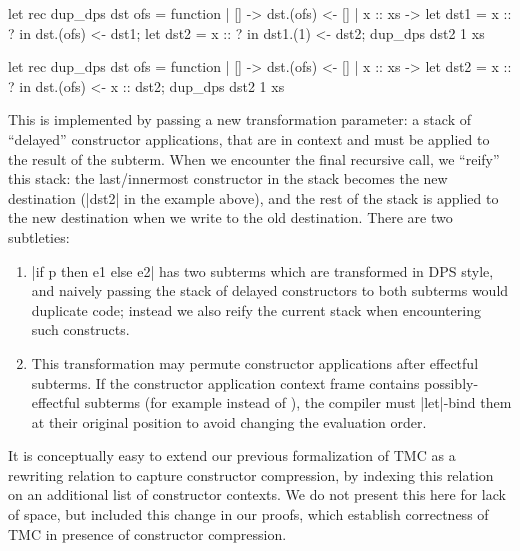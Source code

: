 \begin{minipage}{0.5\linewidth}
\begin{Ocaml}
let rec dup_dps dst ofs = function
| [] -> dst.(ofs) <- []
| x :: xs ->
  let dst1 = x :: ? in
  dst.(ofs) <- dst1;
  let dst2 = x :: ? in
  dst1.(1) <- dst2;
  dup_dps dst2 1 xs
\end{Ocaml}
\end{minipage}
\hfill
\begin{minipage}{0.5\linewidth}
\begin{Ocaml}
let rec dup_dps dst ofs = function
| [] -> dst.(ofs) <- []
| x :: xs ->
  let dst2 = x :: ? in
  dst.(ofs) <- x :: dst2;
  dup_dps dst2 1 xs
\end{Ocaml}
\end{minipage}

This is implemented by passing a new transformation parameter: a stack of ``delayed'' constructor applications, that are in context and must be applied to the result of the subterm. When we encounter the final recursive call, we ``reify'' this stack: the last/innermost constructor in the stack becomes the new destination (\ocaml|dst2| in the example above), and the rest of the stack is applied to the new destination when we write to the old destination. There are two subtleties:
\begin{enumerate}
\item \ocaml|if p then e1 else e2| has two subterms which are transformed in DPS style, and naively passing the stack of delayed constructors to both subterms would duplicate code; instead we also reify the current stack when encountering such constructs.
\item This transformation may permute constructor applications after effectful subterms. If the constructor application context frame contains possibly-effectful subterms (for example  instead of ), the compiler must \ocaml|let|-bind them at their original position to avoid changing the evaluation order.
\end{enumerate}

It is conceptually easy to extend our previous formalization of TMC as a rewriting relation to capture constructor compression, by indexing this relation on an additional list of constructor contexts. We do not present this here for lack of space, but included this change in our \Coq proofs, which establish correctness of TMC in presence of constructor compression.

